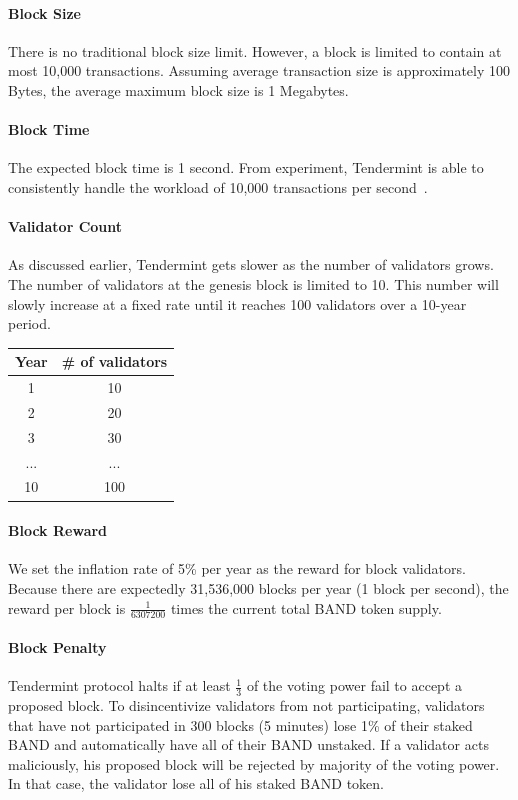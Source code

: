 \documentclass[letterpaper,11pt]{article}
\begin{document}
\paragraph{Block Size} There is no traditional block size limit. However, a block is limited to contain at most 10,000 transactions. Assuming average transaction size is approximately 100 Bytes, the average maximum block size is 1 Megabytes.

\paragraph{Block Time} The expected block time is 1 second. From experiment, Tendermint is able to consistently handle the workload of 10,000 transactions per second~\cite{tendermint10k}.

\paragraph{Validator Count} As discussed earlier, Tendermint gets slower as the number of validators grows. The number of validators at the genesis block is limited to 10. This number will slowly increase at a fixed rate until it reaches 100 validators over a 10-year period.

\begin{center}
\begin{tabular}{ c | c }
Year & \# of validators \\ \hline
1 & 10 \\
2 & 20 \\
3 & 30 \\
... & ... \\
10 & 100 \\
\end{tabular}
\end{center}

\paragraph{Block Reward} We set the inflation rate of 5\% per year as the reward for block validators. Because there are expectedly 31,536,000 blocks per year (1 block per second), the reward per block is $\frac{1}{6307200}$ times the current total BAND token supply.

\paragraph{Block Penalty} Tendermint protocol halts if at least $\frac{1}{3}$ of the voting power fail to accept a proposed block. To disincentivize validators from not participating, validators that have not participated in 300 blocks (5 minutes) lose 1\% of their staked BAND and automatically have all of their BAND unstaked. If a validator acts maliciously, his proposed block will be rejected by majority of the voting power. In that case, the validator lose all of his staked BAND token.
\end{document}
